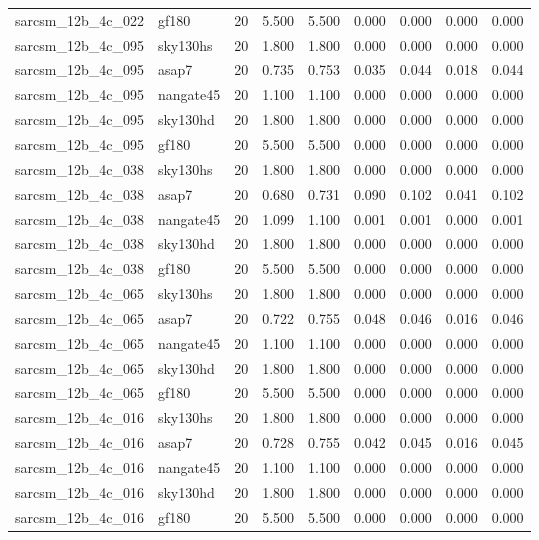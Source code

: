 \begin{tabular}{llrrrrrrr}
sarcsm\_12b\_4c\_022 & gf180 & 20 & 5.500 & 5.500 & 0.000 & 0.000 & 0.000 & 0.000 \\
sarcsm\_12b\_4c\_095 & sky130hs & 20 & 1.800 & 1.800 & 0.000 & 0.000 & 0.000 & 0.000 \\
sarcsm\_12b\_4c\_095 & asap7 & 20 & 0.735 & 0.753 & 0.035 & 0.044 & 0.018 & 0.044 \\
sarcsm\_12b\_4c\_095 & nangate45 & 20 & 1.100 & 1.100 & 0.000 & 0.000 & 0.000 & 0.000 \\
sarcsm\_12b\_4c\_095 & sky130hd & 20 & 1.800 & 1.800 & 0.000 & 0.000 & 0.000 & 0.000 \\
sarcsm\_12b\_4c\_095 & gf180 & 20 & 5.500 & 5.500 & 0.000 & 0.000 & 0.000 & 0.000 \\
sarcsm\_12b\_4c\_038 & sky130hs & 20 & 1.800 & 1.800 & 0.000 & 0.000 & 0.000 & 0.000 \\
sarcsm\_12b\_4c\_038 & asap7 & 20 & 0.680 & 0.731 & 0.090 & 0.102 & 0.041 & 0.102 \\
sarcsm\_12b\_4c\_038 & nangate45 & 20 & 1.099 & 1.100 & 0.001 & 0.001 & 0.000 & 0.001 \\
sarcsm\_12b\_4c\_038 & sky130hd & 20 & 1.800 & 1.800 & 0.000 & 0.000 & 0.000 & 0.000 \\
sarcsm\_12b\_4c\_038 & gf180 & 20 & 5.500 & 5.500 & 0.000 & 0.000 & 0.000 & 0.000 \\
sarcsm\_12b\_4c\_065 & sky130hs & 20 & 1.800 & 1.800 & 0.000 & 0.000 & 0.000 & 0.000 \\
sarcsm\_12b\_4c\_065 & asap7 & 20 & 0.722 & 0.755 & 0.048 & 0.046 & 0.016 & 0.046 \\
sarcsm\_12b\_4c\_065 & nangate45 & 20 & 1.100 & 1.100 & 0.000 & 0.000 & 0.000 & 0.000 \\
sarcsm\_12b\_4c\_065 & sky130hd & 20 & 1.800 & 1.800 & 0.000 & 0.000 & 0.000 & 0.000 \\
sarcsm\_12b\_4c\_065 & gf180 & 20 & 5.500 & 5.500 & 0.000 & 0.000 & 0.000 & 0.000 \\
sarcsm\_12b\_4c\_016 & sky130hs & 20 & 1.800 & 1.800 & 0.000 & 0.000 & 0.000 & 0.000 \\
sarcsm\_12b\_4c\_016 & asap7 & 20 & 0.728 & 0.755 & 0.042 & 0.045 & 0.016 & 0.045 \\
sarcsm\_12b\_4c\_016 & nangate45 & 20 & 1.100 & 1.100 & 0.000 & 0.000 & 0.000 & 0.000 \\
sarcsm\_12b\_4c\_016 & sky130hd & 20 & 1.800 & 1.800 & 0.000 & 0.000 & 0.000 & 0.000 \\
sarcsm\_12b\_4c\_016 & gf180 & 20 & 5.500 & 5.500 & 0.000 & 0.000 & 0.000 & 0.000 \\

\end{tabular}
